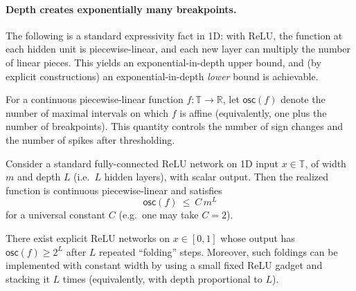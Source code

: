\paragraph{Depth creates exponentially many breakpoints.}
The following is a standard expressivity fact in 1D: with ReLU, the function at each hidden unit is piecewise-linear, and each new layer can multiply the number of linear pieces.
This yields an exponential-in-depth upper bound, and (by explicit constructions) an exponential-in-depth \emph{lower} bound is achievable.

\begin{definition}\label{def:osc-count}
For a continuous piecewise-linear function $f:\mathbb{T}\to\mathbb{R}$, let $\mathsf{osc}(f)$ denote the number of maximal intervals on which $f$ is affine (equivalently, one plus the number of breakpoints).
This quantity controls the number of sign changes and the number of spikes after thresholding.
\end{definition}

\begin{lemma}\label{lem:1d-spline-exp}
\provedflag
Consider a standard fully-connected ReLU network on 1D input $x\in\mathbb{T}$, of width $m$ and depth $L$ (i.e.\ $L$ hidden layers), with scalar output.
Then the realized function is continuous piecewise-linear and satisfies
\[
\mathsf{osc}(f)\ \le\ C\,m^L
\]
for a universal constant $C$ (e.g.\ one may take $C=2$).
\end{lemma}

\begin{lemma}\label{lem:1d-osc-achieve}
\provedflag
There exist explicit ReLU networks on $x\in[0,1]$ whose output has $\mathsf{osc}(f)\ge 2^L$ after $L$ repeated ``folding'' steps.
Moreover, such foldings can be implemented with constant width by using a small fixed ReLU gadget and stacking it $L$ times (equivalently, with depth proportional to $L$).
\end{lemma}

